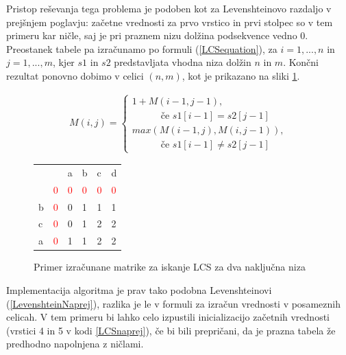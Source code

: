 \documentclass[a4paper,12pt,openright]{book}
\begin{document}
Pristop reševanja tega problema je podoben kot za Levenshteinovo razdaljo v prejšnjem poglavju: začetne vrednosti za prvo vrstico in prvi stolpec so v tem primeru kar ničle, saj je pri praznem nizu dolžina podsekvence vedno 0. Preostanek tabele pa izračunamo po formuli (\ref{LCSequation}), za $i=1,...,n$ in $j=1,...,m$, kjer $s1$ in $s2$ predstavljata vhodna niza dolžin $n$ in $m$. Končni rezultat ponovno dobimo v celici $(n, m)$, kot je prikazano na sliki \ref{LCSexample}. 

\begin{equation}
\label{LCSequation}
\begin{aligned}
M(i, j) = 
\begin{cases}
     1 + M(i-1, j-1) ,      \\ \quad \quad \quad\text{če } s1[i-1]=s2[j-1]\\
     max(M(i-1, j), M(i, j-1)) , \\ \quad \quad \quad \text{če } s1[i-1] \neq s2[j-1]
  \end{cases}
\end{aligned}
\end{equation}

\bigskip \bigskip

\begin{figure}[htb]
\begin{center}
\begin{tabular}{|l|l|l|l|l|l|}
\cline{3-6}
  \multicolumn{2}{c|}{}  & a & b & c & d\\ \cline{2-6}
 \multicolumn{1}{c|}{} & \textcolor{red}{0} & \textcolor{red}{0} & \textcolor{red}{0} & \textcolor{red}{0} & \textcolor{red}{0}\\ \hline
b  & \textcolor{red}{0} & 0 & \cellcolor{blue!15}1 & 1 & 1\\ \hline
c  & \textcolor{red}{0} & 0 & 1 & \cellcolor{blue!15}2 & \cellcolor{blue!15}2\\ \hline
a  & \textcolor{red}{0} & 1 & 1 & 2 & \cellcolor{blue!25}2 \\ \hline
\end{tabular}
\end{center}
\caption{Primer izračunane matrike za iskanje LCS za dva naključna niza}
\label{LCSexample}
\end{figure}

Implementacija algoritma je prav tako podobna Levenshteinovi (\ref{LevenshteinNaprej}), razlika je le v formuli za izračun vrednosti v posameznih celicah. V tem primeru bi lahko celo izpustili inicializacijo začetnih vrednosti (vrstici 4 in 5 v kodi \ref{LCSnaprej}), če bi bili prepričani, da je prazna tabela že predhodno napolnjena z ničlami. 
\end{document}
